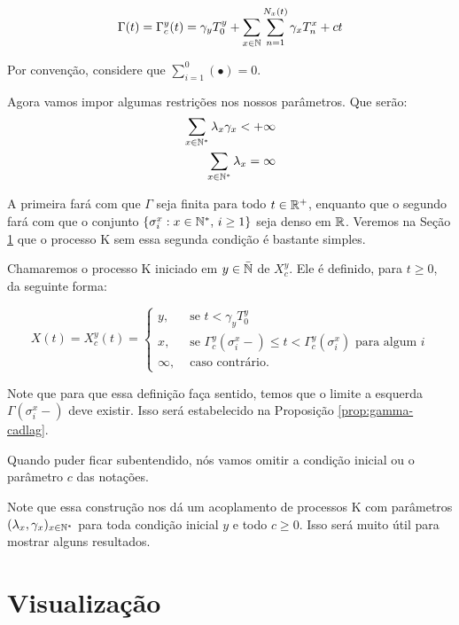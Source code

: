 \begin{equation}
  \label{def:Gamma}
  \Gamma(t) = \Gamma^y_c (t) = \gamma_y T_0^y
  + \sum_{x \in {\mathbb{N}}} \sum_{n = 1}^{N_x(t)}
  \gamma_x T_n^x
  + ct
\end{equation}

Por convenção, considere que $\sum_{i=1}^{0}( \bullet ) = 0$.

Agora vamos impor algumas restrições nos nossos parâmetros. Que serão:
\begin{align}
  \sum_{x \in {\mathbb{N^*}}} \lambda_x\gamma_x < +\infty\\
  \sum_{x \in {\mathbb{N^*}}} \lambda_x = \infty\\
\end{align}

A primeira fará com que $\Gamma$ seja \qc finita para todo $t \in
{\mathbb{R}}^+$, enquanto que o segundo fará com que o conjunto $\{\sigma^x_i: x
\in {\mathbb{N^*}}, \, i \geq 1\}$ seja denso em ${\mathbb{R}}$. Veremos na Seção
\ref{sec:visualizacao} que o processo K sem essa segunda condição é
bastante simples.

Chamaremos o processo K iniciado em $y \in {\bar{{\mathbb{N}}}}$ de $X^y_c$. Ele é
definido, para $t \geq 0$, da seguinte forma:

\begin{equation}
  \label{def:procK}
  X(t) = X^y_c (t) =
  \begin{cases}
    y, & \textrm{ se }  t < \gamma_y T_0^y\\
    x, & \textrm{ se } \Gamma^y_c(\sigma_i^x-) \leq t <
    \Gamma^y_c(\sigma^x_i)
    \textrm{ para algum } i \\
    \infty, & \textrm{ caso contrário.}
  \end{cases}
\end{equation}

Note que para que essa definição faça sentido, temos que o limite a
esquerda $\Gamma (\sigma_i^x-)$ deve existir. Isso será estabelecido
na Proposição \ref{prop:gamma-cadlag}.

Quando puder ficar subentendido, nós vamos omitir a condição inicial
ou o parâmetro $c$ das notações.

Note que essa construção nos dá um acoplamento de processos K com
parâmetros $(\lambda_x, \gamma_x)_{x \in {\mathbb{N^*}}}$ para toda condição
inicial $y$ e todo $c \geq 0$. Isso será muito útil para mostrar
alguns resultados.



\section{Visualização}
\label{sec:visualizacao}

